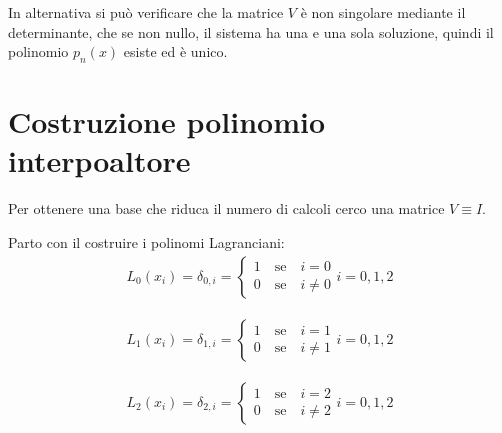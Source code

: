 In alternativa si può verificare che la matrice $V$ è non singolare mediante il determinante, che se non nullo, il 
sistema ha una e una sola soluzione, quindi il polinomio $p_n(x)$ esiste ed è unico.

\section{Costruzione polinomio interpoaltore}

Per ottenere una base che riduca il numero di calcoli cerco una matrice $V \equiv I$.

Parto con il costruire i polinomi Lagranciani:
\begin{equation}
  \begin{array}{c}

    L_0(x_i) = \delta_{0, i}

    =

    \begin{cases}
      1 \quad \text{se} \quad i = 0 \\ 
      0 \quad \text{se} \quad i \neq 0
    \end{cases}

    i = 0, 1, 2

  \end{array}
\end{equation}

\begin{equation}
  \begin{array}{c}

    L_1(x_i) = \delta_{1, i}

    =

    \begin{cases}
      1 \quad \text{se} \quad i = 1 \\ 
      0 \quad \text{se} \quad i \neq 1
    \end{cases}

    i = 0, 1, 2

  \end{array}
\end{equation}

\begin{equation}
  \begin{array}{c}

    L_2(x_i) = \delta_{2, i}

    =

    \begin{cases}
      1 \quad \text{se} \quad i = 2 \\ 
      0 \quad \text{se} \quad i \neq 2
    \end{cases}

    i = 0, 1, 2

  \end{array}
\end{equation}


